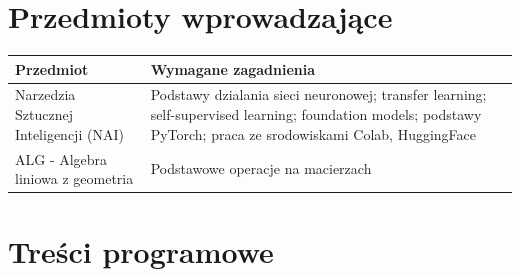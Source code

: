 \documentclass[12pt, a4paper]{article}
\newcommand{\thdrule}{\noalign{\global\setlength{\extrarowheight}{0pt}}}
\newcommand{\thdend}{\noalign{\global\setlength{\extrarowheight}{3pt}}}
\begin{document}
\section{Przedmioty wprowadzające}

{\scriptsize
\begin{tabularx}{\textwidth}{m{5cm}Y}
\thdrule\toprule
{} {\color{white}\textbf{Przedmiot}} & {\color{white}\textbf{Wymagane zagadnienia}} \\
\midrule\thdend
   Narzedzia Sztucznej Inteligencji (NAI) & Podstawy dzialania sieci neuronowej; transfer learning; self-supervised learning; foundation models; podstawy PyTorch; praca ze srodowiskami Colab, HuggingFace \\
   ALG - Algebra liniowa z geometria & Podstawowe operacje na macierzach \\
\bottomrule
\end{tabularx}}

\section{Treści programowe}
\end{document}
